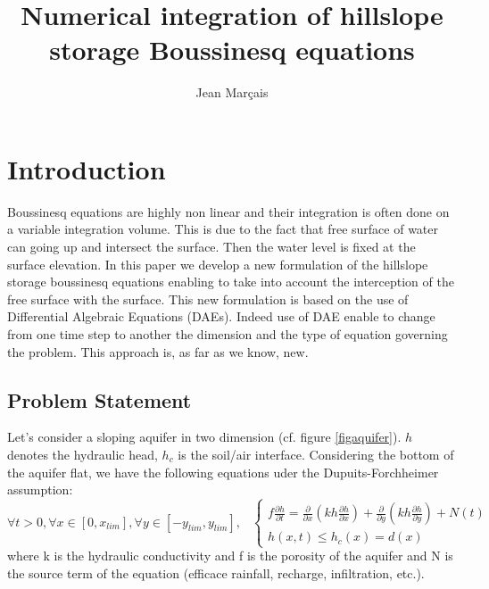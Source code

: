 \documentclass[
journal=jacsat, %
manuscript=article]{achemso}
\author{Jean Marçais}
\title[\texttt{achemso} demonstration]
{Numerical integration of hillslope storage Boussinesq equations}
\begin{document}


\section{Introduction}

Boussinesq equations are highly non linear and their integration is often done on a variable integration volume. This is due to the fact that free surface of water can going up and intersect the surface. Then the water level is fixed at the surface elevation. 
In this paper we develop a new formulation of the hillslope storage boussinesq equations enabling to take into account the interception of the free surface with the surface. This new formulation is based on the use of Differential Algebraic Equations (DAEs). Indeed use of DAE enable to change from one time step to another the dimension and the type of equation governing the problem. This approach is, as far as we know, new.

\subsection{Problem Statement}
Let's consider a sloping aquifer in two dimension (cf. figure \ref{figaquifer}). $h$ denotes the hydraulic head, $h_c$ is the soil/air interface.
Considering the bottom of the aquifer flat, we have the following equations uder the Dupuits-Forchheimer assumption:
\begin{equation}
\label{eqDupuits2D}
\forall t > 0, \forall x \in [0,x_{lim}], \forall y \in [-y_{lim},y_{lim}], \, \,\: \:
\begin{cases}
    f \frac{\partial h}{\partial t}  =  \frac{\partial}{\partial x}(k h  \frac{\partial h}{\partial x}) + \frac{\partial}{\partial y}(k h \frac{ \partial h}{\partial y}) + N(t) \\
    h(x,t) \leq h_{c}(x) = d(x)
\end{cases}
\end{equation}
where k is the hydraulic conductivity and f is the porosity of the aquifer and N is the source term of the equation (efficace rainfall, recharge, infiltration, etc.).
\end{document}
